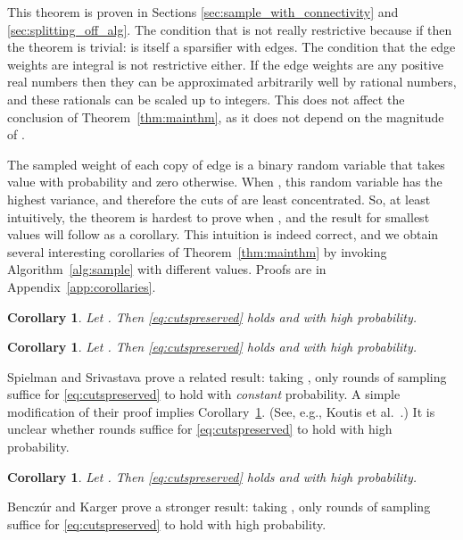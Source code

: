 \documentclass[11pt]{article}
\numberwithin{equation}{section}
\newtheorem{corollary}[theorem]{Corollary}
\newcommand{\Algorithm}[1]{Algorithm~\ref{alg:#1}}
\newcommand{\Appendix}[1]{Appendix~\ref{app:#1}}
\newcommand{\CorollaryName}[1]{\label{cor:#1}}
\newcommand{\Corollary}[1]{Corollary~\ref{cor:#1}}
\newcommand{\Theorem}[1]{Theorem~\ref{thm:#1}}
\begin{document}
This theorem is proven in Sections \ref{sec:sample_with_connectivity} and \ref{sec:splitting_off_alg}.
The condition that  is not really restrictive because
if  then the theorem is trivial:  is itself a sparsifier with  edges.
The condition that the edge weights are integral is not restrictive either.
If the edge weights are any positive real numbers then they can be approximated
arbitrarily well by rational numbers, and these rationals can be scaled up to integers.
This does not affect the conclusion of \Theorem{mainthm}, as it
does not depend on the magnitude of .

The sampled weight of each copy of edge 
is a binary random variable that takes value 
 with probability  and zero otherwise.
When , this random variable has the highest variance,
and therefore the cuts of  are least concentrated.
So, at least intuitively, the theorem is hardest to prove when ,
and the result for smallest  values will follow as a corollary. 
This intuition is indeed correct, and we obtain several interesting corollaries of \Theorem{mainthm}
by invoking \Algorithm{sample} with different  values.
Proofs are in \Appendix{corollaries}.

\begin{corollary}
\CorollaryName{sample_with_connectivity}
Let . Then \eqref{eq:cutspreserved} holds
and  with high probability.
\end{corollary}

\begin{corollary}
\CorollaryName{sample_with_conductance}
Let .
Then \eqref{eq:cutspreserved} holds
and  with high probability.
\end{corollary}

Spielman and Srivastava \cite{SS} prove a related result:
taking , only  rounds of sampling suffice
for \eqref{eq:cutspreserved} to hold with \emph{constant} probability.
A simple modification of their proof implies \Corollary{sample_with_conductance}.
(See, e.g., Koutis et al.~\cite{KMP}.)
It is unclear whether  rounds suffice
for \eqref{eq:cutspreserved} to hold with high probability.

\begin{corollary}
\CorollaryName{sample_with_strength}
Let .
Then \eqref{eq:cutspreserved} holds
and  with high probability.
\end{corollary}

Bencz\'ur and Karger \cite{BK} prove a stronger result:
taking , only  rounds of sampling suffice
for \eqref{eq:cutspreserved} to hold with high probability.
\end{document}
